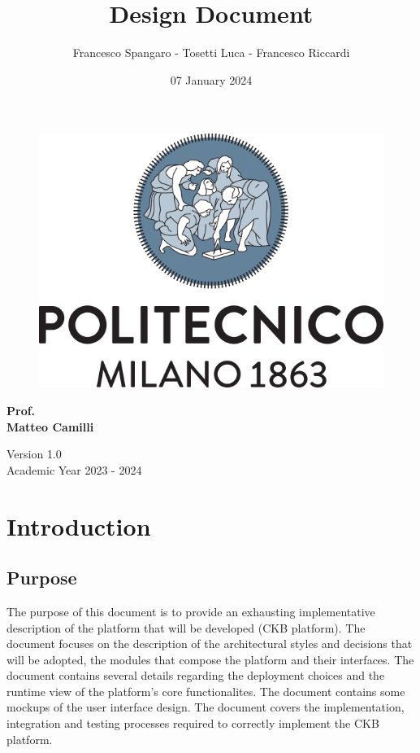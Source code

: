 \documentclass{article}
\title{\Huge{\textbf{Design Document}}}
\author{\Large{Francesco Spangaro - Tosetti Luca - Francesco Riccardi}}
\date{07 January 2024}
\begin{document}
\maketitle

\begin{figure}[h]
    \centering
    \includegraphics[scale=0.6]{politecnico-di-milano-logo.png}
\end{figure}

\vspace*{1cm}
\begin{center}
      \Large{\textbf{Prof.}} \\
      \Large{\textbf{Matteo Camilli}}
\end{center}
\vspace*{1cm}

\begin{center}
      \large{Version 1.0} \\
      \large{Academic Year 2023 - 2024}
\end{center}
\newpage
\tableofcontents


\pagestyle{IntroductionStyle}

\section{Introduction}
\subsection{Purpose}
The purpose of this document is to provide an exhausting implementative
description of the platform that will be developed (CKB platform).
The document focuses on the description of the architectural styles and decisions
that will be adopted, the modules that compose the platform and their interfaces.
The document contains several details regarding the deployment choices and
the runtime view of the platform's core functionalites.
The document contains some mockups of the user interface design.
The document covers the implementation, integration and testing
processes required to correctly implement the CKB platform.
\end{document}

